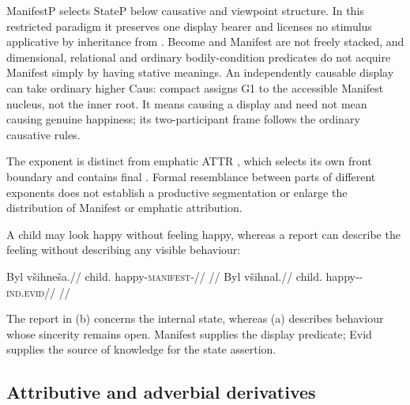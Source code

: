 ManifestP selects StateP below causative and viewpoint structure. In this
restricted paradigm it preserves one display bearer and licenses no stimulus
applicative by inheritance from . Become and Manifest are not
freely stacked, and dimensional, relational and ordinary bodily-condition
predicates do not acquire Manifest simply by having stative meanings.
An independently causable display can take ordinary higher Caus: compact
 assigns G1 to the accessible Manifest nucleus, not
the inner root. It means causing a display and need not mean causing genuine
happiness; its two-participant frame follows the ordinary causative rules.

The exponent is distinct from emphatic ATTR , which selects
its own front boundary and contains final . Formal resemblance between
parts of different exponents does not establish a productive segmentation
or enlarge the distribution of Manifest or emphatic attribution.


A child may look happy without feeling happy, whereas a report can
describe the feeling without describing any visible behaviour:

\pex\label{ex:deriv-slot-display}
\a
\begingl
\gla Byl všihneša.//
\glb child.\Dir{} happy-\textsc{manifest}-\Cont{}//
\glft {}
//
\endgl
\a
\begingl
\gla Byl všihnal.//
\glb child.\Dir{} happy-\Cont{}-\textsc{ind.evid}//
\glft {}
//
\endgl
\xe

The report in (b) concerns the internal state, whereas (a) describes
behaviour whose sincerity remains open. Manifest supplies the display
predicate; Evid supplies the source of knowledge for the state assertion.

\subsection{Attributive and adverbial derivatives}\label{sec:stative-attr}


